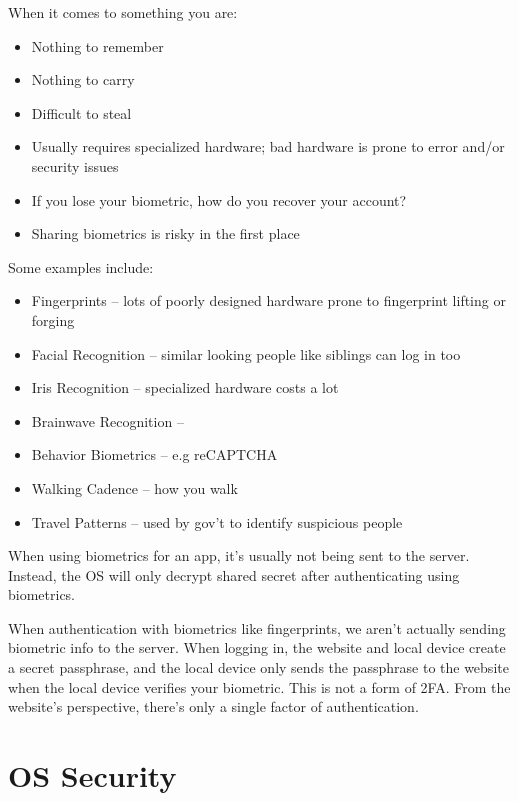 \documentclass[code]{amznotes}
\begin{document}
When it comes to something you are:
\begin{itemize}[noitemsep]
    \item Nothing to remember
    \item Nothing to carry
    \item Difficult to steal
    \item Usually requires specialized hardware; bad hardware is prone to error and/or security issues
    \item If you lose your biometric, how do you recover your account?
    \item Sharing biometrics is risky in the first place
\end{itemize}

Some examples include:
\begin{itemize}[noitemsep]
    \item Fingerprints -- lots of poorly designed hardware prone to fingerprint lifting or forging
    \item Facial Recognition -- similar looking people like siblings can log in too
    \item Iris Recognition -- specialized hardware costs a lot
    \item Brainwave Recognition --
    \item Behavior Biometrics -- e.g reCAPTCHA
    \item Walking Cadence -- how you walk
    \item Travel Patterns -- used by gov't to identify suspicious people
\end{itemize}

When using biometrics for an app, it's usually not being sent to the server. Instead, the OS will only decrypt shared secret after authenticating using biometrics.

\begin{notebox}{}
    When authentication with biometrics like fingerprints, we aren't actually sending biometric info to the server. When logging in, the website and local device create a secret passphrase, and the local device only sends the passphrase to the website when the local device verifies your biometric. This is not a form of 2FA. From the website's perspective, there's only a single factor of authentication.
\end{notebox}

\chapter{OS Security}
\end{document}
